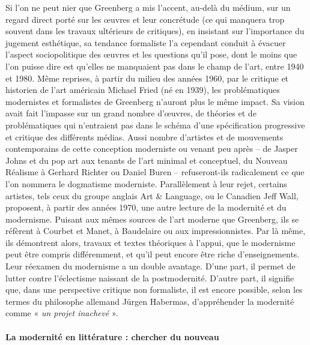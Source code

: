 Si l'on ne peut nier que Greenberg a mis l'accent, au-delà du médium, sur un regard direct porté sur les œuvres et leur concrétude (ce qui manquera trop souvent dans les travaux ultérieurs de critiques), en insistant sur l'importance du jugement esthétique, sa tendance formaliste l'a cependant conduit à évacuer l'aspect sociopolitique des œuvres et les questions qu'il pose, dont le moins que l'on puisse dire est qu'elles ne manquaient pas dans le champ de l'art, entre 1940 et 1980.
Même reprises, à partir du milieu des années 1960, par le critique et historien de l'art américain Michael Fried (né en 1939), les problématiques modernistes et formalistes de Greenberg n'auront plus le même impact. Sa vision avait fait l'impasse sur un grand nombre d'œuvres, de théories et de problématiques qui n'entraient pas dans le schéma d'une spécification progressive et critique des différents médias. Aussi nombre d'artistes et de mouvements contemporains de cette conception moderniste ou venant peu après – de Jasper Johns et du pop art aux tenants de l'art minimal et conceptuel, du Nouveau Réalisme à Gerhard Richter ou Daniel Buren – refuseront-ils radicalement ce que l'on nommera le dogmatisme moderniste.
Parallèlement à leur rejet, certains artistes, tels ceux du groupe anglais Art & Language, ou le Canadien Jeff Wall, proposent, à partir des années 1970, une autre lecture de la modernité et du modernisme. Puisant aux mêmes sources de l'art moderne que Greenberg, ils se réfèrent à Courbet et Manet, à Baudelaire ou aux impressionnistes. Par là même, ils démontrent alors, travaux et textes théoriques à l'appui, que le modernisme peut être compris différemment, et qu'il peut encore être riche d'enseignements. Leur réexamen du modernisme a un double avantage. D'une part, il permet de lutter contre l'éclectisme naissant de la postmodernité. D'autre part, il signifie que, dans une perspective critique non formaliste, il est encore possible, selon les termes du philosophe allemand Jürgen Habermas, d'appréhender la modernité comme « \textit{un projet inachevé }».

\paragraph{La modernité en littérature : chercher du nouveau}


